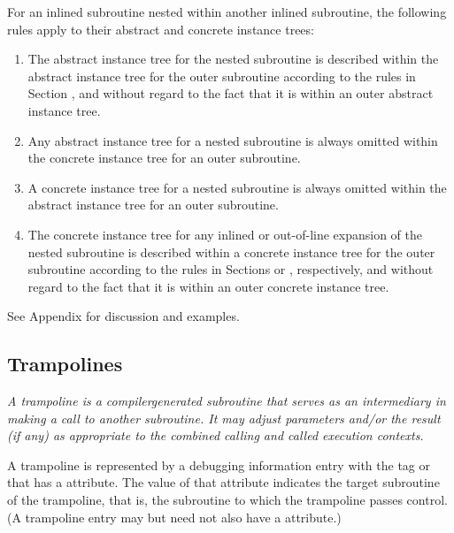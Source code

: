 For an inlined subroutine nested within another inlined
subroutine, the following rules apply to their abstract and
concrete instance trees:

\begin{enumerate}[1. ]
\item The abstract instance tree for the nested subroutine is
described within the abstract instance tree for the outer
subroutine according to the rules in 
Section , and
without regard to the fact that it is within an outer abstract
instance tree.

\item Any abstract instance tree for a nested subroutine is
always omitted within the concrete instance tree for an
outer subroutine.

\item  A concrete instance tree for a nested subroutine is
always omitted within the abstract instance tree for an
outer subroutine.

\item The concrete instance tree for any inlined or 
out-of-line
expansion of the nested subroutine is described within a
concrete instance tree for the outer subroutine according
to the rules in 
Sections  or 
, respectively,
and without regard to the fact that it is within an outer
concrete instance tree.
\end{enumerate}

See Appendix  
for discussion and examples.

\subsection{Trampolines}
\label{chap:trampolines}

\textit{A trampoline is a compiler\dash generated subroutine that serves as
\hypertarget{chap:DWATtrampolinetargetsubroutine}{}
an intermediary in making a call to another subroutine. It may
adjust parameters and/or the result (if any) as appropriate
to the combined calling and called execution contexts.}

A trampoline is represented by a debugging information entry
with the tag \DWTAGsubprogram{} or \DWTAGinlinedsubroutine{}
that has 
a \DWATtrampolineDEFN{} attribute. 
The value of that
attribute indicates the target subroutine of the trampoline,
that is, the subroutine to which the trampoline passes
control. (A trampoline entry may but need not also have a
\DWATartificial{} attribute.)

